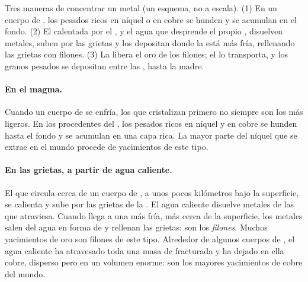 \begin{omfigure}
{\small Tres maneras de concentrar un metal (un esquema, no a escala).
(1) En un cuerpo de , los  pesados ricos en níquel o en
cobre se hunden y se acumulan en el fondo. (2) El 
calentada por el , y el agua que desprende el propio , disuelven
metales, suben por las grietas y los depositan donde la  está más
fría, rellenando las grietas con filones. (3) La  libera el oro de
los filones; el  lo transporta, y los granos pesados se depositan entre
las , hasta la  madre.}
\label{fig:g9:earth-resources:deposits}
\end{omfigure}

\paragraph{En el magma.} Cuando un cuerpo de  se enfría, los
 que cristalizan primero no siempre son los más ligeros. En los
 procedentes del , los  pesados ricos en níquel y en
cobre se hunden hasta el fondo y se acumulan en una capa rica. La mayor
parte del níquel que se extrae en el mundo procede de yacimientos de este
tipo.

\paragraph{En las grietas, a partir de agua caliente.} El  que circula cerca de un cuerpo de , a unos pocos
kilómetros bajo la superficie, se calienta y sube por las grietas de la
. El agua caliente disuelve metales de las  que atraviesa. Cuando
llega a una  más fría, más cerca de la superficie, los metales salen
del agua en forma de  y rellenan las grietas: son los
\emph{filones}. Muchos yacimientos de oro son filones de
este tipo. Alrededor de algunos cuerpos de , el agua caliente ha
atravesado toda una masa de  fracturada y ha dejado en ella cobre,
disperso pero en un volumen enorme: son los mayores yacimientos de cobre
del mundo.

